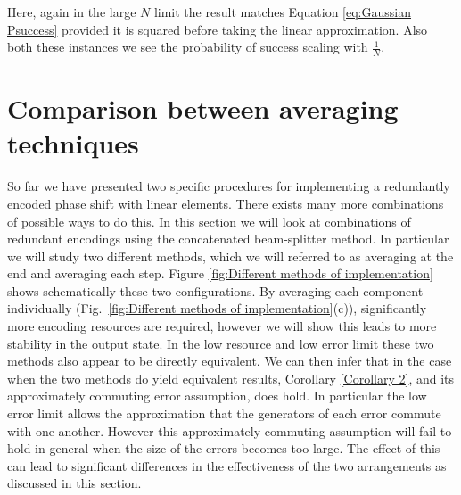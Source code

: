 \documentclass[aps,pra,twocolumn,superscriptaddress,numerical,floatfix]{revtex4-1}
\begin{document}
Here, again in the large $N$ limit the result matches Equation \ref{eq:Gaussian Psuccess} provided it is squared before taking the linear approximation. Also both these instances we see the probability of success scaling with $\frac{1}{N}$.

\section{Comparison between averaging techniques \label{averaging at end vs step}}

So far we have presented two specific procedures for implementing a redundantly encoded phase shift with linear elements.  There exists many more combinations of possible ways to do this.  In this section we will look at combinations of redundant encodings using the concatenated beam-splitter method.  In particular we will study two different methods, which we will referred to as averaging at the end and averaging each step. Figure \ref{fig:Different methods of implementation} shows schematically these two configurations.  By averaging each component individually (Fig.~\ref{fig:Different methods of implementation}(c)), significantly more encoding resources are required, however we will show this leads to more stability in the output state. In the low resource and low error limit these two methods also appear to be directly equivalent. We can then infer that in the case when the two methods do yield equivalent results, Corollary \ref{Corollary 2}, and its approximately commuting error assumption, does hold. In particular the low error limit allows the approximation that the generators of each error commute with one another. However this approximately commuting assumption will fail to hold in general when the size of the errors becomes too large. The effect of this can lead to significant differences in the effectiveness of the two arrangements as discussed in this section.
\end{document}
